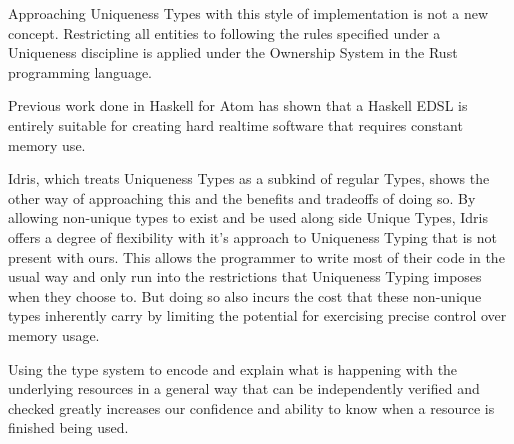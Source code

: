 \documentclass[10pt]{article}
\begin{document}
\begin{multicols}{2}
    Approaching Uniqueness Types with this style of implementation is not a new
    concept.  Restricting all entities to following the rules specified under a
    Uniqueness discipline is applied under the Ownership System in the Rust
    programming language. 
    
    Previous work done in Haskell for Atom has shown that a Haskell EDSL
    is entirely suitable for creating hard realtime software that requires constant
    memory use.

    Idris, which treats Uniqueness Types as a subkind of regular Types, shows
    the other way of approaching this and the benefits and tradeoffs of doing so.
    By allowing non-unique types to exist and be used along side Unique Types,
    Idris offers a degree of flexibility with it's approach to Uniqueness
    Typing that is not present with ours.  
    This allows the programmer to write most of their code in the usual way and
    only run into the restrictions that Uniqueness Typing imposes when they choose to.
    But doing so also incurs the cost that these non-unique types inherently
    carry by limiting the potential for exercising precise control over memory
    usage.
    
    Using the type system to encode and explain what is happening with the underlying
    resources in a general way that can be independently verified and checked greatly
    increases our confidence and ability to know when a resource is finished being used.


    

\end{multicols}
\end{document}
